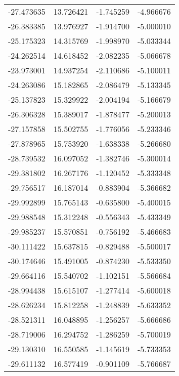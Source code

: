 \begin{tabular}{rrrr}
      -27.473635 &        13.726421 &   -1.745259 &  -4.966676 \\
      -26.383385 &        13.976927 &   -1.914700 &  -5.000010 \\
      -25.175323 &        14.315769 &   -1.998970 &  -5.033344 \\
      -24.262514 &        14.618452 &   -2.082235 &  -5.066678 \\
      -23.973001 &        14.937254 &   -2.110686 &  -5.100011 \\
      -24.263086 &        15.182865 &   -2.086479 &  -5.133345 \\
      -25.137823 &        15.329922 &   -2.004194 &  -5.166679 \\
      -26.306328 &        15.389017 &   -1.878477 &  -5.200013 \\
      -27.157858 &        15.502755 &   -1.776056 &  -5.233346 \\
      -27.878965 &        15.753920 &   -1.638338 &  -5.266680 \\
      -28.739532 &        16.097052 &   -1.382746 &  -5.300014 \\
      -29.381802 &        16.267176 &   -1.120452 &  -5.333348 \\
      -29.756517 &        16.187014 &   -0.883904 &  -5.366682 \\
      -29.992899 &        15.765143 &   -0.635800 &  -5.400015 \\
      -29.988548 &        15.312248 &   -0.556343 &  -5.433349 \\
      -29.985237 &        15.570851 &   -0.756192 &  -5.466683 \\
      -30.111422 &        15.637815 &   -0.829488 &  -5.500017 \\
      -30.174646 &        15.491005 &   -0.874230 &  -5.533350 \\
      -29.664116 &        15.540702 &   -1.102151 &  -5.566684 \\
      -28.994438 &        15.615107 &   -1.277414 &  -5.600018 \\
      -28.626234 &        15.812258 &   -1.248839 &  -5.633352 \\
      -28.521311 &        16.048895 &   -1.256257 &  -5.666686 \\
      -28.719006 &        16.294752 &   -1.286259 &  -5.700019 \\
      -29.130310 &        16.550585 &   -1.145619 &  -5.733353 \\
      -29.611132 &        16.577419 &   -0.901109 &  -5.766687 \\

\end{tabular}
